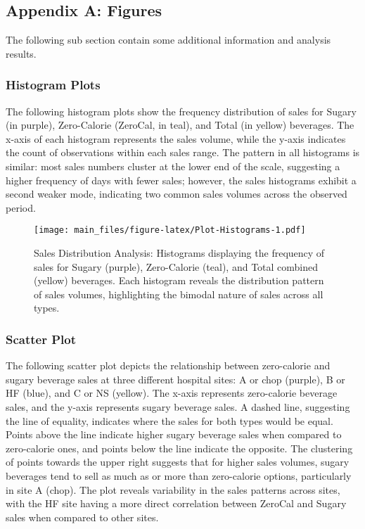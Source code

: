 \documentclass[
]{article}
\begin{document}
\pagebreak

\hypertarget{appendix-a-figures}{%
\subsection{Appendix A: Figures}\label{appendix-a-figures}}

The following sub section contain some additional information and
analysis results.

\hypertarget{histogram-plots}{%
\subsubsection{Histogram Plots}\label{histogram-plots}}

The following histogram plots show the frequency distribution of sales
for Sugary (in purple), Zero-Calorie (ZeroCal, in teal), and Total (in
yellow) beverages. The x-axis of each histogram represents the sales
volume, while the y-axis indicates the count of observations within each
sales range. The pattern in all histograms is similar: most sales
numbers cluster at the lower end of the scale, suggesting a higher
frequency of days with fewer sales; however, the sales histograms
exhibit a second weaker mode, indicating two common sales volumes across
the observed period.

\begin{figure}
\centering
\texttt{[image: main\_files/figure-latex/Plot-Histograms-1.pdf]}
\caption{Sales Distribution Analysis: Histograms displaying the
frequency of sales for Sugary (purple), Zero-Calorie (teal), and Total
combined (yellow) beverages. Each histogram reveals the distribution
pattern of sales volumes, highlighting the bimodal nature of sales
across all types.}
\end{figure}

\hypertarget{scatter-plot}{%
\subsubsection{Scatter Plot}\label{scatter-plot}}

The following scatter plot depicts the relationship between zero-calorie
and sugary beverage sales at three different hospital sites: A or chop
(purple), B or HF (blue), and C or NS (yellow). The x-axis represents
zero-calorie beverage sales, and the y-axis represents sugary beverage
sales. A dashed line, suggesting the line of equality, indicates where
the sales for both types would be equal. Points above the line indicate
higher sugary beverage sales when compared to zero-calorie ones, and
points below the line indicate the opposite. The clustering of points
towards the upper right suggests that for higher sales volumes, sugary
beverages tend to sell as much as or more than zero-calorie options,
particularly in site A (chop). The plot reveals variability in the sales
patterns across sites, with the HF site having a more direct correlation
between ZeroCal and Sugary sales when compared to other sites.
\end{document}

